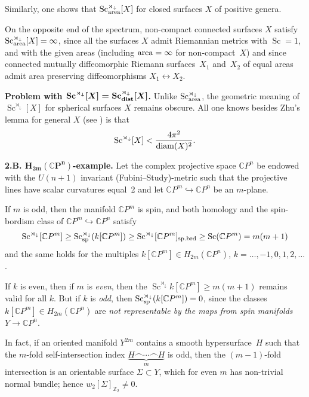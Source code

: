 \documentclass[10pt,a4paper]{amsart}
\numberwithin{equation}{section}
\begin{document}
Similarly, one shows that
$\operatorname{Sc}_{\rm area}^{\rtimes_\downarrow}[X]$ for closed surfaces $X$ of positive genera.

On the opposite end of the spectrum, non-compact connected surfaces $X$ satisfy
$\operatorname{Sc}_{\rm area}^{\rtimes_\downarrow}[X]=\infty$,
since all the surfaces $X$ admit Riemannian metrics
with $\operatorname{Sc}=1$, and with the given areas (including ${\rm area}=\infty$ for non-compact~$X$) and since connected mutually diffeomorphic Riemann surfaces~$X_1$ and~$X_2$ of equal areas admit area preserving diffeomorphisms $X_1\leftrightarrow X_2$.

\textbf{Problem with $\boldsymbol{\operatorname{Sc}^{\rtimes_\downarrow}[X]=\operatorname{Sc}_{\rm dist}^{\rtimes_\downarrow}[X]}$.} Unlike $\operatorname{Sc}_{\rm area}^{\rtimes_\downarrow}$, the geometric meaning of
$\operatorname{Sc}^{\rtimes_\downarrow}[X]$ for spherical surfaces $X$ remains obscure. All one knows besides Zhu's lemma for general $X$ (see  \cite[Section~2.8]{Gr2021}) is that
\[
\operatorname{Sc}^{\rtimes_\downarrow}[X]<{4\pi^2\over \operatorname{diam}(X)^2}.
\]

\textbf{2.B. $\boldsymbol{H_{2m}(\mathbb CP^n)}$-example.} Let the complex projective space $\mathbb CP^n$ be endowed with
 the $U(n+1)$ invariant
(Fubini--Study)-metric such that the projective lines have scalar curvatures equal~2
 and let $\mathbb CP^m\hookrightarrow \mathbb CP^n$ be an $m$-plane.

If $m$ is odd, then the manifold $\mathbb CP^m$ is spin, and both homology and the spin-bordism class of
$ \mathbb CP^m \hookrightarrow \mathbb CP^n$ satisfy
\[
\operatorname{Sc}^{\rtimes_\downarrow}[\mathbb CP^m]\geq \operatorname{Sc}_{\rm sp}^{\rtimes_\downarrow}(k[\mathbb CP^m])\geq \operatorname{Sc}^{\rtimes_\downarrow}[\mathbb CP^m]_{\rm sp.brd}\geq \operatorname{Sc}( \mathbb CP^m)=m(m+1)
\]
and the same holds for the multiples $k[\mathbb CP^m]\in H_{2m}(\mathbb CP^n)$, $k=\dots,-1,0,1,2,\dots$.

If $k$ is even, then
if $m$ is {\it even}, then the $\operatorname{Sc}^{\rtimes_\downarrow}k[\mathbb CP^m]\geq m(m+1)$ remains valid for all $k$.
But if
 $k$ is {\it odd}, then
$\operatorname{Sc}_{\rm sp}^{\rtimes_\downarrow}(k[\mathbb CP^m])= 0$,
 since the classes
$k[\mathbb CP^m ]\in H_{2m}(\mathbb CP^n)$ are {\it not representable by the maps from spin manifolds} $Y\to \mathbb CP^n$.

In fact,
if an oriented manifold $Y^{2m} $ contains a smooth hypersurface~$H$ such that the $m$-fold self-intersection index $\underset {m}{\underbrace {H\frown \cdots \frown H}}$ is odd, then
the $(m-1)$-fold intersection is an orientable surface $\Sigma\subset Y$, which for even $m$ has
non-trivial normal bundle; hence $w_2[\Sigma]_{\mathbb Z_2}\neq 0$.
\end{document}
